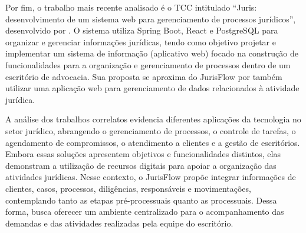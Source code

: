 Por fim, o trabalho mais recente analisado é o TCC intitulado ``Juris: desenvolvimento de um sistema web para gerenciamento de processos jurídicos'', desenvolvido por . O sistema utiliza Spring Boot, React e PostgreSQL para organizar e gerenciar informações jurídicas, tendo como objetivo projetar e implementar um sistema de informação (aplicativo web) focado na construção de funcionalidades para a organização e gerenciamento de processos dentro de um escritório de advocacia. Sua proposta se aproxima do JurisFlow por também utilizar uma aplicação web para gerenciamento de dados relacionados à atividade jurídica.

A análise dos trabalhos correlatos evidencia diferentes aplicações da tecnologia no setor jurídico, abrangendo o gerenciamento de processos, o controle de tarefas, o agendamento de compromissos, o atendimento a clientes e a gestão de escritórios. Embora essas soluções apresentem objetivos e funcionalidades distintos, elas demonstram a utilização de recursos digitais para apoiar a organização das atividades jurídicas. Nesse contexto, o JurisFlow propõe integrar informações de clientes, casos, processos, diligências, responsáveis e movimentações, contemplando tanto as etapas pré-processuais quanto as processuais. Dessa forma, busca oferecer um ambiente centralizado para o acompanhamento das demandas e das atividades realizadas pela equipe do escritório.

